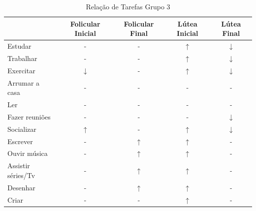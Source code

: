         \begin{table}[]
            \centering
            \caption{Relação de Tarefas Grupo 3}
            \label{tab12}
            \begin{tabular}{|l|c|c|c|c|}
            \hline
            \rowcolor[HTML]{C0C0C0} 
            \multicolumn{1}{|c|}{\cellcolor[HTML]{C0C0C0}Tarefas recomendadas}  & Folicular Inicial & Folicular Final  & Lútea Inicial& Lútea Final \\ \hline
            Estudar & -  & - & $\uparrow$ & $\downarrow$ \\ \hline
            \rowcolor[HTML]{EFEFEF} 
            Trabalhar & - & -  & $\uparrow$ &  $\downarrow$  \\ \hline
            Exercitar & $\downarrow$ & -& $\uparrow$ &  $\downarrow$  \\ \hline
            \rowcolor[HTML]{EFEFEF} 
            Arrumar a casa  & - & -  & - & - \\ \hline
            Ler & - & -  & - & - \\ \hline
            \rowcolor[HTML]{EFEFEF} 
            Fazer reuniões & - & - & -& $\downarrow$ \\ \hline
            \rowcolor[HTML]{EFEFEF} 
            Socializar & $\uparrow$ & -  & $\uparrow$ & $\downarrow$ \\ \hline
            \rowcolor[HTML]{EFEFEF} 
            Escrever & - & $\uparrow$  & $\uparrow$ & - \\ \hline
            Ouvir música & - & $\uparrow$  & $\uparrow$  & -\\ \hline
            \rowcolor[HTML]{EFEFEF} 
            Assistir séries/Tv & - &  $\uparrow$ &  $\uparrow$ & - \\ \hline
            Desenhar & -  & $\uparrow$  & $\uparrow$ & - \\ \hline
            \rowcolor[HTML]{EFEFEF} 
            Criar & - &  -  &  $\uparrow$ & - \\ \hline
            \end{tabular}
            \end{table}

